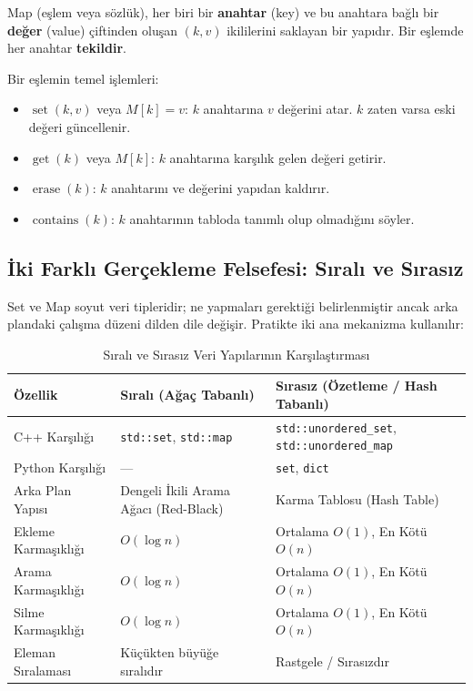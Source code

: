 \begin{definition}
Map (eşlem veya sözlük), her biri bir \textbf{anahtar} (key) ve bu anahtara bağlı bir \textbf{değer} (value) çiftinden oluşan $(k, v)$ ikililerini saklayan bir yapıdır. Bir eşlemde her anahtar \textbf{tekildir}.
\end{definition}

Bir eşlemin temel işlemleri:
\begin{itemize}
    \item $\operatorname{set}(k, v)$ veya $M[k] = v$: $k$ anahtarına $v$ değerini atar. $k$ zaten varsa eski değeri güncellenir.
    \item $\operatorname{get}(k)$ veya $M[k]$: $k$ anahtarına karşılık gelen değeri getirir.
    \item $\operatorname{erase}(k)$: $k$ anahtarını ve değerini yapıdan kaldırır.
    \item $\operatorname{contains}(k)$: $k$ anahtarının tabloda tanımlı olup olmadığını söyler.
\end{itemize}

\subsection{İki Farklı Gerçekleme Felsefesi: Sıralı ve Sırasız}
Set ve Map soyut veri tipleridir; ne yapmaları gerektiği belirlenmiştir ancak arka plandaki çalışma düzeni dilden dile değişir. Pratikte iki ana mekanizma kullanılır:

\begin{table}[h]
\centering
\begin{small}\begin{tabular}{|l|p{4.2cm}|p{4.2cm}|}
\hline
\textbf{Özellik} & \textbf{Sıralı (Ağaç Tabanlı)} & \textbf{Sırasız (Özetleme / Hash Tabanlı)} \\
\hline
C++ Karşılığı & \texttt{std::set}, \texttt{std::map} & \texttt{std::unordered\_set}, \texttt{std::unordered\_map} \\
Python Karşılığı & --- & \texttt{set}, \texttt{dict} \\
Arka Plan Yapısı & Dengeli İkili Arama Ağacı (Red-Black) & Karma Tablosu (Hash Table) \\
Ekleme Karmaşıklığı & $O(\log n)$ & Ortalama $O(1)$, En Kötü $O(n)$ \\
Arama Karmaşıklığı & $O(\log n)$ & Ortalama $O(1)$, En Kötü $O(n)$ \\
Silme Karmaşıklığı & $O(\log n)$ & Ortalama $O(1)$, En Kötü $O(n)$ \\
Eleman Sıralaması & Küçükten büyüğe sıralıdır & Rastgele / Sırasızdır \\
\hline
\end{tabular}\end{small}
\caption{Sıralı ve Sırasız Veri Yapılarının Karşılaştırması}
\end{table}

